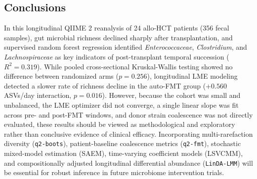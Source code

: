 \subsection{Conclusions}
In this longitudinal QIIME 2 reanalysis of 24 allo-HCT patients (356 fecal samples), gut microbial richness declined sharply after transplantation, and supervised random forest regression identified \textit{Enterococcaceae}, \textit{Clostridium}, and \textit{Lachnospiraceae} as key indicators of post-transplant temporal succession ($R^2 = 0.319$). While pooled cross-sectional Kruskal-Wallis testing showed no difference between randomized arms ($p = 0.256$), longitudinal LME modeling detected a slower rate of richness decline in the auto-FMT group ($+0.560$ ASVs/day interaction, $p = 0.016$). However, because the cohort was small and unbalanced, the LME optimizer did not converge, a single linear slope was fit across pre- and post-FMT windows, and donor strain coalescence was not directly evaluated, these results should be viewed as methodological and exploratory rather than conclusive evidence of clinical efficacy. Incorporating multi-rarefaction diversity (\texttt{q2-boots}), patient-baseline coalescence metrics (\texttt{q2-fmt}), stochastic mixed-model estimation (SAEM), time-varying coefficient models (LSVCMM), and compositionally adjusted longitudinal differential abundance (\texttt{LinDA-LMM}) will be essential for robust inference in future microbiome intervention trials.
